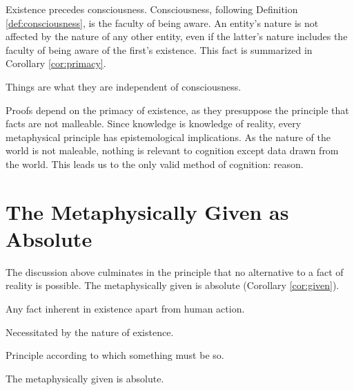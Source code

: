         Existence precedes consciousness. Consciousness, following Definition \ref{def:consciousness}, is the faculty of being aware. An entity's nature is not affected by the nature of any other entity, even if the latter's nature includes the faculty of being aware of the first's existence. This fact is summarized in Corollary \ref{cor:primacy}.
        
            \begin{corollary}
            \label{cor:primacy}
                Things are what they are independent of consciousness.
            \end{corollary}
        
        Proofs depend on the primacy of existence, as they presuppose the principle that facts are not malleable. Since knowledge is knowledge of reality, every metaphysical principle has epistemological implications. As the nature of the world is not maleable, nothing is relevant to cognition except data drawn from the world. This leads us to the only valid method of cognition: reason.
            
    \section{The Metaphysically Given as Absolute}
    
        The discussion above culminates in the principle that no alternative to a fact of reality is possible. The metaphysically given is absolute (Corollary \ref{cor:given}).
    
            \begin{definition}
                Any fact inherent in existence apart from human action.
            \end{definition}
            
            \begin{definition}[Absolute]
                Necessitated by the nature of existence.
            \end{definition}

            \begin{definition}[Necessity]
                Principle according to which something must be so.
            \end{definition}
            
            \begin{corollary}
            \label{cor:given}
                The metaphysically given is absolute.
            \end{corollary}
            
